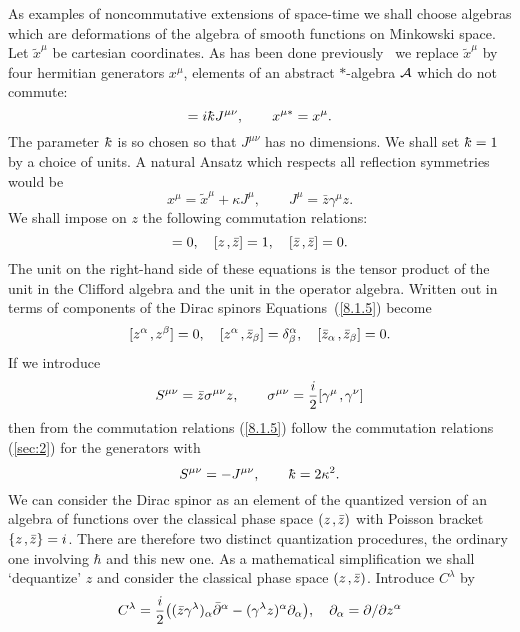 \documentclass[a4paper,12pt]{article}
\def\p{\partial}
\def\t#1{\tilde #1}
\def\c#1{{\cal #1}}
\def\kbar{{\mathchar'26\mkern-9muk}}
\def\t#1{\tilde #1}
\def\k{\kern-.1em\mathbin{,}\kern-.1em}
\begin{document}
As examples of noncommutative extensions of space-time we shall choose
algebras which are deformations of the algebra of smooth functions on
Minkowski space. Let $\t{x}^{\mu}$ be cartesian coordinates. As has been
done previously~\cite{Sny47a,Mad89c,DopFreRob95} we replace $\t{x}^{\mu}$
by four hermitian generators $x^{\mu}$, elements of an abstract
$*$-algebra $\c{A}$ which do not commute:
\begin{equation}
[x^{\mu}\k x^{\nu}] = i\kbar J^{\mu\nu},   \qquad  
x^{\mu *} = x^{\mu}.                                          \label{sec:2}
\end{equation}
The parameter $\kbar$ is so chosen so that $J^{\mu\nu}$ has no
dimensions.  We shall set $\kbar = 1$ by a choice of units.
A natural Ansatz which respects all reflection symmetries would be
\begin{equation}
x^{\mu} = \t{x}^{\mu} + \kappa J^{\mu}, \qquad
J^{\mu} = \bar z \gamma^{\mu} z.                               \label{8.1.4}
\end{equation}
We shall impose on $z$ the following commutation relations:
\begin{equation}
[ z\k z] = 0, \quad [z\k \bar z ] = 1, \quad [\bar z\k \bar z ] = 0. 
                                                               \label{8.1.5}
\end{equation}
The unit on the right-hand side of these equations is the tensor
product of the unit in the Clifford algebra and the unit in the
operator algebra.  Written out in terms of components of the Dirac
spinors Equations~(\ref{8.1.5}) become
$$
[ z^\alpha\k z^\beta] = 0, \quad 
[z^\alpha\k \bar z_\beta ] = \delta^\alpha_\beta, \quad 
[\bar z_\alpha\k \bar z_\beta ] = 0. 
$$
If we introduce
$$
S^{\mu\nu} = \bar z \sigma^{\mu\nu} z, \qquad 
\sigma^{\mu\nu} = {i\over 2} [\gamma^{\mu}\k \gamma^{\nu}]     %
$$
then from the commutation relations (\ref{8.1.5}) follow the commutation
relations (\ref{sec:2}) for the generators with 
$$
S^{\mu\nu} = - J^{\mu\nu},\qquad \kbar  = 2 \kappa^2.     %
$$ 
We can consider the Dirac spinor as an element of the quantized
version of an algebra of functions over the classical phase space 
$(z\k \bar z)$ with Poisson bracket $\{ z\k \bar z \} = i$. There are
therefore two distinct quantization procedures, the
ordinary one involving $\hbar$ and this new one. As a mathematical
simplification we shall `dequantize' $z$ and consider the classical
phase space $(z\k \bar z)$. Introduce $C^{\lambda}$ by
$$
C^\lambda = {i\over 2} 
\big(( \bar z \gamma^\lambda)_\alpha \bar \p^\alpha 
  - (\gamma^\lambda z )^\alpha \p_\alpha \big),  \quad 
\p_\alpha = \p /\p z^\alpha                              %
$$
\end{document}
